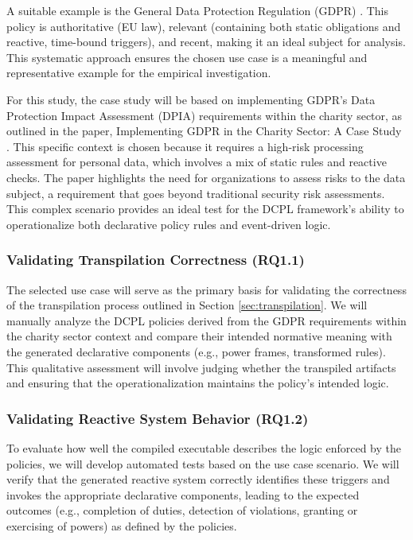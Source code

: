 A suitable example is the General Data Protection Regulation (GDPR) \cite{GDPR2016a}. This policy is authoritative (EU law), relevant (containing both static obligations and reactive, time-bound triggers), and recent, making it an ideal subject for analysis. This systematic approach ensures the chosen use case is a meaningful and representative example for the empirical investigation. 

For this study, the case study will be based on implementing GDPR's Data Protection Impact Assessment (DPIA) requirements within the charity sector, as outlined in the paper, Implementing GDPR in the Charity Sector: A Case Study \cite{CharityGDPR}. This specific context is chosen because it requires a high-risk processing assessment for personal data, which involves a mix of static rules and reactive checks. The paper highlights the need for organizations to assess risks to the data subject, a requirement that goes beyond traditional security risk assessments. This complex scenario provides an ideal test for the DCPL framework's ability to operationalize both declarative policy rules and event-driven logic.

\subsubsection{Validating Transpilation Correctness (RQ1.1)}
The selected use case will serve as the primary basis for validating the correctness of the transpilation process outlined in Section \ref{sec:transpilation}. We will manually analyze the DCPL policies derived from the GDPR requirements within the charity sector context and compare their intended normative meaning with the generated declarative components (e.g., power frames, transformed rules). This qualitative assessment will involve judging whether the transpiled artifacts and ensuring that the operationalization maintains the policy's intended logic.

\subsubsection{Validating Reactive System Behavior (RQ1.2)}
To evaluate how well the compiled executable describes the logic enforced by the policies, we will develop automated tests based on the use case scenario. We will verify that the generated reactive system correctly identifies these triggers and invokes the appropriate declarative components, leading to the expected outcomes (e.g., completion of duties, detection of violations, granting or exercising of powers) as defined by the policies.


